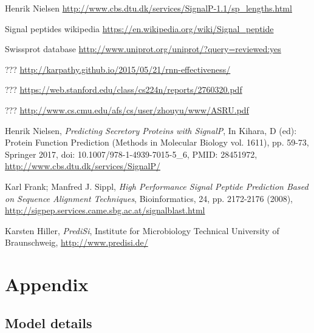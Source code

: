 \newpage

\begin{thebibliography}{9}

 Henrik Nielsen
\url{http://www.cbs.dtu.dk/services/SignalP-1.1/sp_lengths.html}

 Signal peptides wikipedia
\url{https://en.wikipedia.org/wiki/Signal_peptide}

 Swissprot database
\url{http://www.uniprot.org/uniprot/?query=reviewed:yes}

 ???
\url{http://karpathy.github.io/2015/05/21/rnn-effectiveness/}

 ???
\url{https://web.stanford.edu/class/cs224n/reports/2760320.pdf}

 ???
\url{http://www.cs.cmu.edu/afs/cs/user/zhouyu/www/ASRU.pdf}

 Henrik Nielsen,
 {\em Predicting Secretory Proteins with SignalP},
 In Kihara, D (ed): Protein Function Prediction (Methods in Molecular Biology vol. 1611),  pp. 59-73, Springer 2017, doi: 10.1007/978-1-4939-7015-5\_6, PMID: 28451972, 
\url{http://www.cbs.dtu.dk/services/SignalP/}  %

 Karl Frank; Manfred J. Sippl,
{\em High Performance Signal Peptide Prediction Based on Sequence Alignment Techniques},
Bioinformatics, 24, pp. 2172-2176 (2008), \url{http://sigpep.services.came.sbg.ac.at/signalblast.html}

  Karsten Hiller,
{\em PrediSi}, Institute for Microbiology Technical University of Braunschweig, 
\url{http://www.predisi.de/}

\end{thebibliography}


\newpage

\section{Appendix}

\subsection{Model details}

